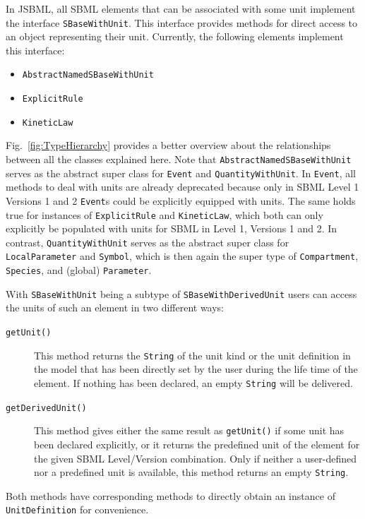 \documentclass[
  BCOR12mm,
  letterpaper,
  11pt,
  headsepline,
  pointlessnumbers,
  tablecaptionabove,
  onelinecaption,
  headinclude,
  appendixprefix,
  idxtotoc,
  bibtotoc,
  twoside,
  titlepage
]{scrartcl}
\begin{document}
In JSBML, all SBML elements that can be associated with some unit implement the
interface \texttt{SBaseWithUnit}. This interface provides methods for direct
access to an object representing their unit. Currently, the following elements
implement this interface:
\begin{itemize}
 \item \texttt{AbstractNamedSBaseWithUnit}
 \item \texttt{ExplicitRule}
 \item \texttt{KineticLaw}
\end{itemize}
Fig.~\vref{fig:TypeHierarchy} provides a better overview about the relationships
between all the classes explained here. Note that
\texttt{AbstractNamedSBaseWithUnit} serves as the abstract super class for
\texttt{Event} and \texttt{QuantityWithUnit}. In \texttt{Event}, all methods
to deal with units are already deprecated because only in SBML Level 1 Versions
1 and 2 \citep{Hucka2003} \texttt{Event}s could be
explicitly equipped with units. The same holds true for instances of
\texttt{ExplicitRule}
and \texttt{KineticLaw},
which both can only explicitly be populated with units for
SBML in Level 1, Versions 1 and 2. In contrast, \texttt{QuantityWithUnit} serves
as the abstract super class for \texttt{LocalParameter} and \texttt{Symbol},
which is then again the super type of \texttt{Compartment}, \texttt{Species}, and (global) \texttt{Parameter}.

With \texttt{SBaseWithUnit} being a subtype of \texttt{SBaseWithDerivedUnit}
users can access the units of such an element in two different ways:
\begin{description}
 \item[\texttt{getUnit()}] This method returns the \texttt{String} of the unit
 kind or the unit definition in the model
 that has been directly set by the user
 during the life time of the element. If nothing has been declared, an empty
 \texttt{String} will be delivered.
 \item[\texttt{getDerivedUnit()}] This method gives either the same result as
 \texttt{getUnit()} if some unit has been declared explicitly, or it returns the
 predefined unit of the element for the given SBML Level/Version combination.
 Only if neither a user-defined nor a predefined unit is available, this method
 returns an empty \texttt{String}.
\end{description}
Both methods have corresponding methods to directly obtain an instance of
\texttt{UnitDefinition}
for convenience.
\end{document}
